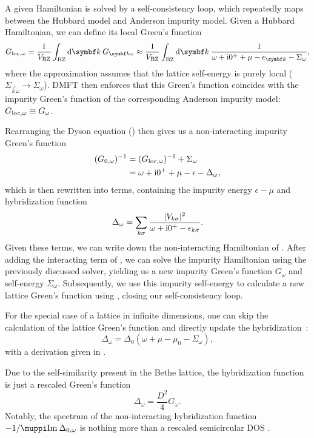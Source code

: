A given Hamiltonian is solved by a self-consistency loop,
which repeatedly maps between the Hubbard model and Anderson impurity model.
Given a Hubbard Hamiltonian, we can define its local Green's function
\begin{equation}
    G_{\mloc,\omega}
    =
    \frac{1}{V_\mBZ} \int_\mBZ \md\vec{k}\> G_{\vec{k}\omega}
    \approx
    \frac{1}{V_\mBZ} \int_\mBZ \md\vec{k}\> \frac{1}{\omega + \mi0^+ + \mu - \epsilon_{\vec{k}} - \Sigma_\omega},
    \label{eq:greens-function-local}
\end{equation}
where the approximation assumes that the lattice self-energy is purely local
($\Sigma_{\vec{k}\omega} \to \Sigma_\omega$).
DMFT then enforces that this Green's function coincides with the impurity Green's function
of the corresponding Anderson impurity model: $G_{\mathrm{loc},\omega} \equiv G_\omega$.

Rearranging the Dyson equation () then gives us a non-interacting impurity
Green's function
\begin{align}
    (G_{0,\omega})^{-1}
     & =
    (G_{\mathrm{loc},\omega})^{-1} + \Sigma_\omega \\
     & =
    \omega + \mathrm{i}0^+ + \mu - \epsilon - \Delta_\omega,
\end{align}
which is then rewritten into terms,
containing the impurity energy $\epsilon - \mu$ and hybridization function
\begin{equation}
    \Delta_\omega = \sum_{k\sigma} \frac{\lvert V_{k\sigma}\rvert^2}{\omega +\mathrm{i}0^+ - \epsilon_{k\sigma}}.
\end{equation}
Given these terms, we can write down the non-interacting Hamiltonian
of .
After adding the interacting term of , we can solve the impurity
Hamiltonian using the previously discussed solver,
yielding us a new impurity Green's function $G_\omega$
and self-energy $\Sigma_\omega$.
Subsequently, we use this impurity self-energy to
calculate a new lattice Green's function using ,
closing our self-consistency loop.

For the special case of a lattice in infinite dimensions,
one can skip the calculation of the lattice Green's function
and directly update the hybridization~\cite{Lu2014}:
\begin{equation}
    \Delta_\omega = \Delta_{0}(\omega + \mu - \mu_0 - \Sigma_\omega),
\end{equation}
with a derivation given in .

Due to the self-similarity present in the Bethe lattice,
the hybridization function is just a rescaled Green's function
\begin{equation}
    \Delta_\omega = \frac{D^2}{4} G_\omega.
\end{equation}
Notably,
the spectrum of the non-interacting hybridization function $-1/\muppi \Im \Delta_{0,\omega}$
is nothing more than a rescaled semicircular DOS .
